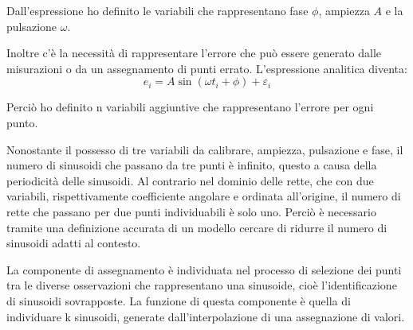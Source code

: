 \documentclass[a4paper,12pt]{report}
\begin{document}
Dall'espressione ho definito le variabili che rappresentano fase $ \phi $, ampiezza $ A $  e la pulsazione $\omega$.

Inoltre c'è la necessità di rappresentare l'errore che può essere generato dalle misurazioni o da un assegnamento di punti errato. L'espressione analitica diventa:
\begin{equation}
\label{vin:sin}
e_i = A\sin(\omega t_i + \phi) + \varepsilon_i
\end{equation}

Perciò ho definito n variabili aggiuntive che rappresentano l'errore per ogni punto.

Nonostante il possesso di tre variabili da calibrare, ampiezza, pulsazione e fase, il numero di sinusoidi che passano da tre punti è infinito, questo a causa della periodicità delle sinusoidi. Al contrario nel dominio delle rette, che con due variabili, rispettivamente coefficiente angolare e ordinata all'origine, il numero di rette che passano per due punti individuabili è solo uno.
Perciò è necessario tramite una definizione accurata di un modello cercare di ridurre il numero di sinusoidi adatti al contesto.

La componente di assegnamento è individuata nel processo di selezione dei punti tra le diverse osservazioni che rappresentano una sinusoide, cioè l'identificazione di sinusoidi sovrapposte.
La funzione di questa componente è quella di individuare k sinusoidi, generate dall'interpolazione di una assegnazione di valori.



%
%
\end{document}
